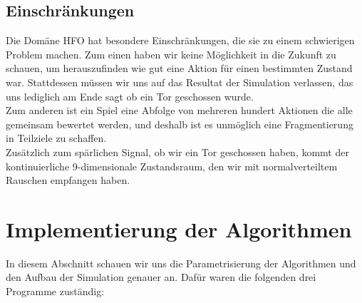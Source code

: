         \subsection{Einschränkungen}
            Die Domäne HFO hat besondere Einschränkungen, die sie zu einem schwierigen Problem machen. Zum einen haben wir keine Möglichkeit in die Zukunft zu schauen, um herauszufinden wie gut eine Aktion für einen bestimmten Zustand war. Stattdessen müssen wir uns auf das Resultat der Simulation verlassen, das uns lediglich am Ende sagt ob ein Tor geschossen wurde. \\[2mm]
            \noindent
            Zum anderen ist ein Spiel eine Abfolge von mehreren hundert Aktionen die alle gemeinsam bewertet werden, und deshalb ist es unmöglich eine Fragmentierung in Teilziele zu schaffen. \\[2mm]
            \noindent
            Zusätzlich zum spärlichen Signal, ob wir ein Tor geschossen haben, kommt der kontinuierliche 9-dimensionale Zustandsraum, den wir mit normalverteiltem Rauschen empfangen haben.


\newpage

    \section{Implementierung der Algorithmen}
        In diesem Abschnitt schauen wir uns die Parametrisierung der Algorithmen und den Aufbau der Simulation genauer an. Dafür waren die folgenden drei Programme zuständig:

